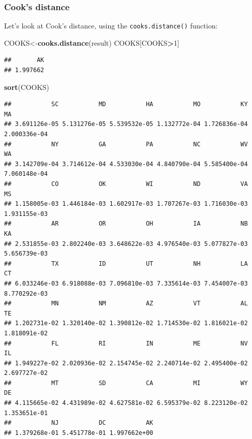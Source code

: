 \documentclass[
]{book}
\newenvironment{Shaded}{\begin{snugshade}}{\end{snugshade}}
\newcommand{\DecValTok}[1]{\textcolor[rgb]{0.00,0.00,0.81}{#1}}
\newcommand{\FunctionTok}[1]{\textcolor[rgb]{0.13,0.29,0.53}{\textbf{#1}}}
\newcommand{\NormalTok}[1]{#1}
\newcommand{\OtherTok}[1]{\textcolor[rgb]{0.56,0.35,0.01}{#1}}
\newcommand{\SpecialCharTok}[1]{\textcolor[rgb]{0.81,0.36,0.00}{\textbf{#1}}}
\begin{document}
\hypertarget{cooks-distance-1}{%
\subsubsection*{Cook's distance}\label{cooks-distance-1}}

Let's look at Cook's distance, using the \texttt{cooks.distance()} function:

\begin{Shaded}
\begin{Highlighting}[]
\NormalTok{COOKS}\OtherTok{\textless{}{-}}\FunctionTok{cooks.distance}\NormalTok{(result)}
\NormalTok{COOKS[COOKS}\SpecialCharTok{\textgreater{}}\DecValTok{1}\NormalTok{]}
\end{Highlighting}
\end{Shaded}

\begin{verbatim}
##       AK 
## 1.997662
\end{verbatim}

\begin{Shaded}
\begin{Highlighting}[]
\FunctionTok{sort}\NormalTok{(COOKS)}
\end{Highlighting}
\end{Shaded}

\begin{verbatim}
##           SC           MD           HA           MO           KY           MA 
## 3.691126e-05 5.131276e-05 5.539532e-05 1.132772e-04 1.726836e-04 2.000336e-04 
##           NY           GA           PA           NC           WV           WA 
## 3.142709e-04 3.714612e-04 4.533030e-04 4.840790e-04 5.585400e-04 7.060148e-04 
##           CO           OK           WI           ND           VA           MS 
## 1.158005e-03 1.446184e-03 1.602917e-03 1.707267e-03 1.716030e-03 1.931155e-03 
##           AR           OR           OH           IA           NB           KA 
## 2.531855e-03 2.802240e-03 3.648622e-03 4.976540e-03 5.077827e-03 5.656739e-03 
##           TX           ID           UT           NH           LA           CT 
## 6.033246e-03 6.918088e-03 7.096810e-03 7.335614e-03 7.454007e-03 8.770292e-03 
##           MN           NM           AZ           VT           AL           TE 
## 1.202731e-02 1.320140e-02 1.390812e-02 1.714530e-02 1.816021e-02 1.818091e-02 
##           FL           RI           IN           ME           NV           IL 
## 1.949227e-02 2.020936e-02 2.154745e-02 2.240714e-02 2.495400e-02 2.697727e-02 
##           MT           SD           CA           MI           WY           DE 
## 4.115665e-02 4.431989e-02 4.627581e-02 6.595379e-02 8.223120e-02 1.353651e-01 
##           NJ           DC           AK 
## 1.379268e-01 5.451778e-01 1.997662e+00
\end{verbatim}
\end{document}
